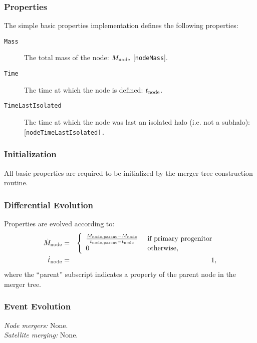 \subsubsection{Properties}

The simple basic properties implementation defines the following properties:
\begin{description}
 \item [{\tt Mass}] The total mass of the node: $M_{\rm node}$ [{\tt nodeMass}].
 \item [{\tt Time}] The time at which the node is defined: $t_{\rm node}$.
 \item [{\tt TimeLastIsolated}] The time at which the node was last an isolated halo (i.e. not a subhalo): [\tt nodeTimeLastIsolated].
\end{description}

\subsubsection{Initialization}

All basic properties are required to be initialized by the merger tree construction routine.

\subsubsection{Differential Evolution}

Properties are evolved according to:
\begin{eqnarray}
 \dot{M}_{\rm node} &=& \left\{\begin{array}{ll}{M_{\rm node, parent} - M_{\rm node} \over t_{\rm node, parent} - t_{\rm node}} & \hbox{ if primary progenitor} \\ 0 & \hbox{ otherwise}, \end{array} \right. \\
 \dot{t}_{\rm node} &=& 1,
\end{eqnarray}
where the ``parent'' subscript indicates a property of the parent node in the merger tree.

\subsubsection{Event Evolution}

\noindent\emph{Node mergers:} None.\\

\noindent\emph{Satellite merging:} None.\\

